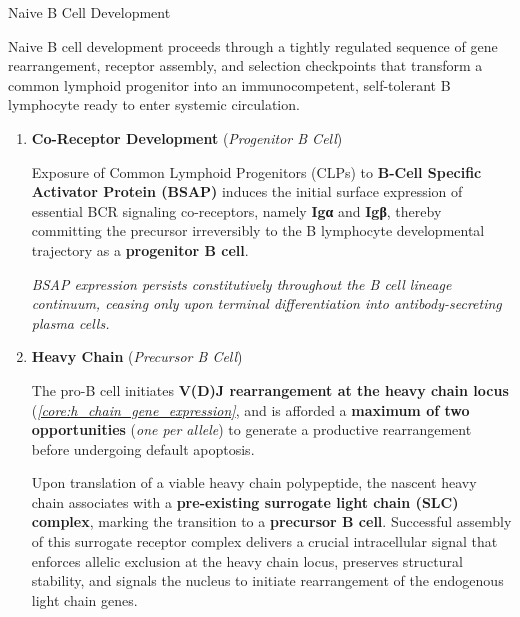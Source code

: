     \begin{core}[label=core:bc_development]{Naive B Cell Development}

      Naive B cell development proceeds through a tightly regulated sequence of gene rearrangement, receptor assembly, and selection checkpoints that transform a common lymphoid progenitor into an immunocompetent, self-tolerant B lymphocyte ready to enter systemic circulation.

      \begin{enumerate}[label=(\arabic*)]

        \item \textbf{Co-Receptor Development} (\textit{Progenitor B Cell})

          Exposure of Common Lymphoid Progenitors (CLPs) to \textbf{B-Cell Specific Activator Protein (BSAP)} induces the initial surface expression of essential BCR signaling co-receptors, namely \textbf{Igα} and \textbf{Igβ}, thereby committing the precursor irreversibly to the B lymphocyte developmental trajectory as a \textbf{progenitor B cell}.

          \textit{BSAP expression persists constitutively throughout the B cell lineage continuum, ceasing only upon terminal differentiation into antibody-secreting plasma cells.}

        \item \textbf{Heavy Chain} (\textit{Precursor B Cell})

          The pro-B cell initiates \textbf{V(D)J rearrangement at the heavy chain locus} (\textit{\autoref{core:h_chain_gene_expression}}, and is afforded a \textbf{maximum of two opportunities} (\textit{one per allele}) to generate a productive rearrangement before undergoing default apoptosis.

          Upon translation of a viable heavy chain polypeptide, the nascent heavy chain associates with a \textbf{pre-existing surrogate light chain (SLC) complex}, marking the transition to a \textbf{precursor B cell}. Successful assembly of this surrogate receptor complex delivers a crucial intracellular signal that enforces allelic exclusion at the heavy chain locus, preserves structural stability, and signals the nucleus to initiate rearrangement of the endogenous light chain genes.



\end{enumerate}
\end{core}
